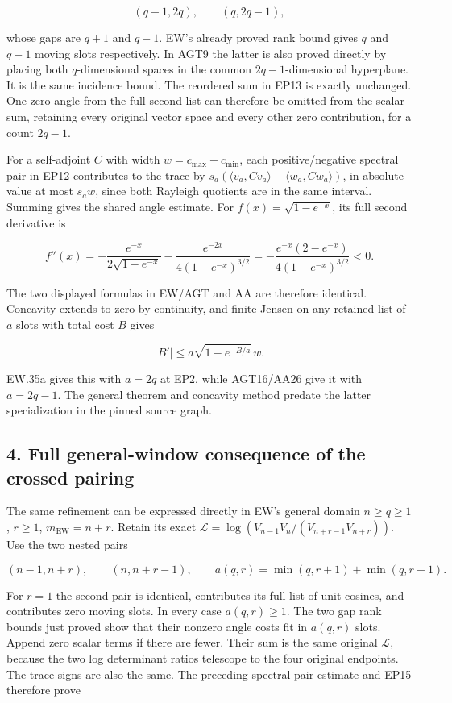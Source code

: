 \[
(q-1,2q),\qquad(q,2q-1),
\tag{EP14}
\]

whose gaps are \(q+1\) and \(q-1\). EW's already proved rank bound gives \(q\) and \(q-1\) moving slots respectively. In AGT9 the latter is also proved directly by placing both \(q\)-dimensional spaces in the common \(2q-1\)-dimensional hyperplane. It is the same incidence bound. The reordered sum in EP13 is exactly unchanged. One zero angle from the full second list can therefore be omitted from the scalar sum, retaining every original vector space and every other zero contribution, for a count \(2q-1\).

For a self-adjoint \(C\) with width \(w=c_{\max}-c_{\min}\), each positive/negative spectral pair in EP12 contributes to the trace by \(s_a(\langle v_a,Cv_a\rangle-\langle w_a,Cw_a\rangle)\), in absolute value at most \(s_aw\), since both Rayleigh quotients are in the same interval. Summing gives the shared angle estimate. For \(f(x)=\sqrt{1-e^{-x}}\), its full second derivative is

\[
f''(x)=-\frac{e^{-x}}{2\sqrt{1-e^{-x}}}
-\frac{e^{-2x}}{4(1-e^{-x})^{3/2}}
=-\frac{e^{-x}(2-e^{-x})}{4(1-e^{-x})^{3/2}}<0.
\tag{EP15}
\]

The two displayed formulas in EW/AGT and AA are therefore identical. Concavity extends to zero by continuity, and finite Jensen on any retained list of \(a\) slots with total cost \(B\) gives

\[
|B'|\le a\sqrt{1-e^{-B/a}}\,w.
\tag{EP16}
\]

EW.35a gives this with \(a=2q\) at EP2, while AGT16/AA26 give it with \(a=2q-1\). The general theorem and concavity method predate the latter specialization in the pinned source graph.

\subsection{4. Full general-window consequence of the crossed pairing}\label{GraphV2:full-general-window-consequence-of-the-crossed-pairing}

The same refinement can be expressed directly in EW's general domain \(n\ge q\ge1\), \(r\ge1\), \(m_{\mathrm{EW}}=n+r\). Retain its exact \(\mathscr L=\log(V_{n-1}V_n/(V_{n+r-1}V_{n+r}))\). Use the two nested pairs

\[
(n-1,n+r),\qquad(n,n+r-1),\qquad
a(q,r)=\min(q,r+1)+\min(q,r-1).
\tag{EP17}
\]

For \(r=1\) the second pair is identical, contributes its full list of unit cosines, and contributes zero moving slots. In every case \(a(q,r)\ge1\). The two gap rank bounds just proved show that their nonzero angle costs fit in \(a(q,r)\) slots. Append zero scalar terms if there are fewer. Their sum is the same original \(\mathscr L\), because the two log determinant ratios telescope to the four original endpoints. The trace signs are also the same. The preceding spectral-pair estimate and EP15 therefore prove

